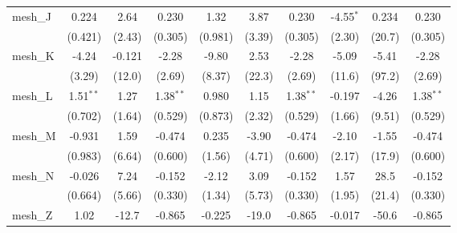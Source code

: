 \begin{tabular}{lccccccccc}
   mesh\_J                                                     & 0.224         & 2.64          & 0.230          & 1.32          & 3.87         & 0.230          & -4.55$^{*}$  & 0.234        & 0.230\\   
                                                               & (0.421)       & (2.43)        & (0.305)        & (0.981)       & (3.39)       & (0.305)        & (2.30)       & (20.7)       & (0.305)\\   
   mesh\_K                                                     & -4.24         & -0.121        & -2.28          & -9.80         & 2.53         & -2.28          & -5.09        & -5.41        & -2.28\\   
                                                               & (3.29)        & (12.0)        & (2.69)         & (8.37)        & (22.3)       & (2.69)         & (11.6)       & (97.2)       & (2.69)\\   
   mesh\_L                                                     & 1.51$^{**}$   & 1.27          & 1.38$^{**}$    & 0.980         & 1.15         & 1.38$^{**}$    & -0.197       & -4.26        & 1.38$^{**}$\\   
                                                               & (0.702)       & (1.64)        & (0.529)        & (0.873)       & (2.32)       & (0.529)        & (1.66)       & (9.51)       & (0.529)\\   
   mesh\_M                                                     & -0.931        & 1.59          & -0.474         & 0.235         & -3.90        & -0.474         & -2.10        & -1.55        & -0.474\\   
                                                               & (0.983)       & (6.64)        & (0.600)        & (1.56)        & (4.71)       & (0.600)        & (2.17)       & (17.9)       & (0.600)\\   
   mesh\_N                                                     & -0.026        & 7.24          & -0.152         & -2.12         & 3.09         & -0.152         & 1.57         & 28.5         & -0.152\\   
                                                               & (0.664)       & (5.66)        & (0.330)        & (1.34)        & (5.73)       & (0.330)        & (1.95)       & (21.4)       & (0.330)\\   
   mesh\_Z                                                     & 1.02          & -12.7         & -0.865         & -0.225        & -19.0        & -0.865         & -0.017       & -50.6        & -0.865\\   

\end{tabular}
